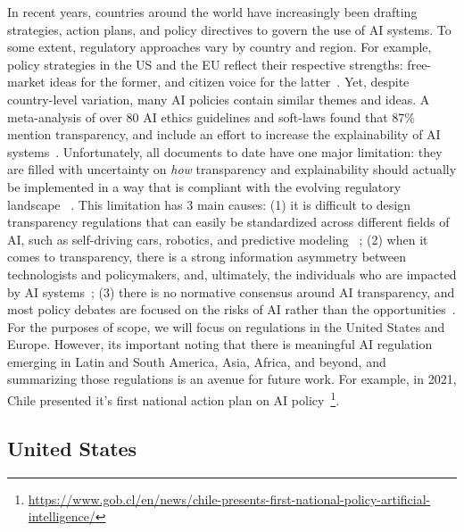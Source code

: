 \documentclass[sigconf, nonacm]{acmart}
\begin{document}
In recent years, countries around the world have increasingly been drafting strategies, action plans, and policy directives to govern the use of AI systems. To some extent, regulatory approaches vary by country and region. For example, policy strategies in the US and the EU reflect their respective strengths: free-market ideas for the former, and citizen voice for the latter~\cite{gill2020policy}. Yet, despite country-level variation, many AI policies contain similar themes and ideas. A meta-analysis of over 80 AI ethics guidelines and soft-laws found that 87\% mention transparency, and include an effort to increase the explainability of AI systems~\cite{DBLP:journals/corr/abs-1906-11668}. Unfortunately, all documents to date have one major limitation: they are filled with uncertainty on \textit{how} transparency and explainability should actually be implemented in a way that is compliant with the evolving regulatory landscape ~\cite{DBLP:journals/corr/abs-1906-11668, DBLP:journals/corr/abs-1906-11668, DBLP:journals/internet/GasserA17, loi2021towards}. This limitation has 3 main causes: (1) it is difficult to design transparency regulations that can easily be standardized across different fields of AI, such as self-driving cars, robotics, and predictive modeling ~\cite{wachter2017transparent}; (2) when it comes to transparency, there is a strong information asymmetry between technologists and policymakers, and, ultimately, the individuals who are impacted by AI systems~\cite{KUZIEMSKI2020101976}; (3) there is no normative consensus around AI transparency, and most policy debates are focused on the risks of AI rather than the opportunities~\cite{DBLP:journals/internet/GasserA17}. For the purposes of scope, we will focus on regulations in the United States and Europe. However, its important noting that there is meaningful AI regulation emerging in Latin and South America, Asia, Africa, and beyond, and summarizing those regulations is an avenue for future work. For example, in 2021, Chile presented it's first national action plan on AI policy~\footnote{\url{https://www.gob.cl/en/news/chile-presents-first-national-policy-artificial-intelligence/}}.

\subsection{United States}
\end{document}
